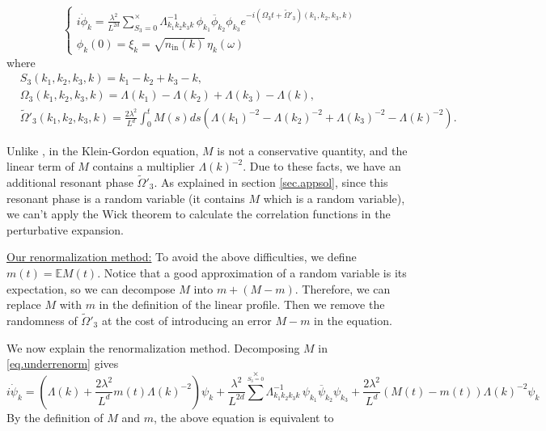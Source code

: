  
 \begin{equation}
\begin{cases}
 i \dot{\phi}_k =  \frac{\lambda^2}{L^{2d}} \sum\limits^{\times}_{S_3=0} \Lambda_{k_1k_2k_3k}^{-1}\,\phi_{k_1}\overline{\phi}_{k_2}  \phi_{k_3} e^{- i (\Omega_3t+\widetilde{\Omega}'_3)(k_1,k_2,k_3,k)} 
 \\[2em]
\phi_k(0) =\xi_k=\sqrt{n_{\textrm{in}}(k)} \, \eta_{k}(\omega)
\end{cases}
\end{equation}
where 
\begin{equation}
\begin{split}
    &S_3(k_1,k_2,k_3,k) = k_1 - k_2 + k_3 - k,
    \\
    &\Omega_3(k_1,k_2,k_3,k) =\Lambda(k_1)-\Lambda(k_2)+\Lambda(k_3)-\Lambda(k),
    \\
    &\widetilde{\Omega}'_3(k_1,k_2,k_3,k)=\frac{2\lambda^2}{L^{d}} \int^t_{0}M(s) ds\left(\Lambda(k_1)^{-2}-\Lambda(k_2)^{-2}+\Lambda(k_3)^{-2}-\Lambda(k)^{-2}\right).
\end{split}
\end{equation}

Unlike \cite{deng2021derivation}, in the Klein-Gordon equation, $M$ is not a conservative quantity, and the linear term of $M$ contains a multiplier $\Lambda(k)^{-2}$. Due to these facts, we have an additional resonant phase $\widetilde{\Omega}'_3$. As explained in section \ref{sec.appsol}, since this resonant phase is a random variable (it contains $M$ which is a random variable), we can't apply the Wick theorem to calculate the correlation functions in the perturbative expansion.

\underline{Our renormalization method:} To avoid the above difficulties, we define $m(t)=\mathbb{E}M(t)$. Notice that a good approximation of a random variable is its expectation, so we can decompose $M$ into $m+(M-m)$. Therefore, we can replace $M$ with $m$ in the definition of the linear profile. Then we remove the randomness of $\widetilde{\Omega}'_3$ at the cost of introducing an error $M-m$ in the equation. 

We now explain the renormalization method. Decomposing $M$ in \eqref{eq.underrenorm} gives
\begin{equation}\label{eq.underrenorm'}
i \dot{\psi}_{k} 
=  \left(\Lambda(k)+\frac{2\lambda^2}{L^{d}} m(t)\Lambda(k)^{-2}\right) \psi_k
+\frac{\lambda^2}{L^{2d}} \sum^{\times}\limits_{S_3=0}  \Lambda_{k_1k_2k_3k}^{-1}\,\psi_{k_1}\overline{\psi}_{k_2}  \psi_{k_3}+\frac{2\lambda^2}{L^{d}} (M(t)-m(t))\Lambda(k)^{-2} \psi_k
\end{equation}
By the definition of $M$ and $m$, the above equation is equivalent to 

